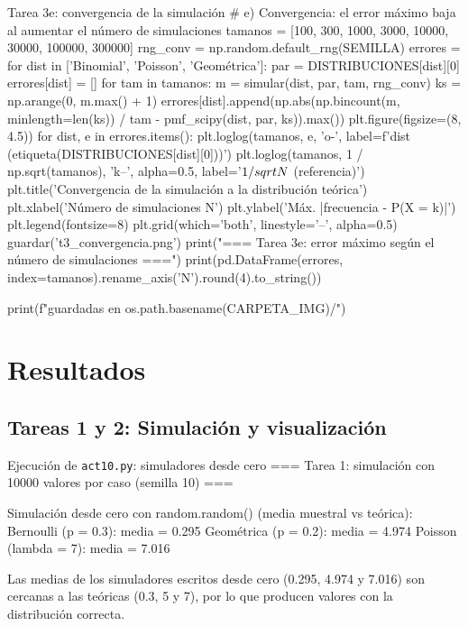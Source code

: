 \documentclass[11pt,letterpaper]{article}
\begin{document}
\begin{codigo}[label=cod:t3e]{Tarea 3e: convergencia de la simulación}
# e) Convergencia: el error máximo baja al aumentar el número de simulaciones
tamanos = [100, 300, 1000, 3000, 10000, 30000, 100000, 300000]
rng_conv = np.random.default_rng(SEMILLA)
errores = {}
for dist in ['Binomial', 'Poisson', 'Geométrica']:
    par = DISTRIBUCIONES[dist][0]
    errores[dist] = []
    for tam in tamanos:
        m = simular(dist, par, tam, rng_conv)
        ks = np.arange(0, m.max() + 1)
        errores[dist].append(np.abs(np.bincount(m, minlength=len(ks)) / tam
                                    - pmf_scipy(dist, par, ks)).max())
plt.figure(figsize=(8, 4.5))
for dist, e in errores.items():
    plt.loglog(tamanos, e, 'o-', label=f'{dist} ({etiqueta(DISTRIBUCIONES[dist][0])})')
plt.loglog(tamanos, 1 / np.sqrt(tamanos), 'k--', alpha=0.5, label='$1/\\sqrt{N}$ (referencia)')
plt.title('Convergencia de la simulación a la distribución teórica')
plt.xlabel('Número de simulaciones N')
plt.ylabel('Máx. |frecuencia - P(X = k)|')
plt.legend(fontsize=8)
plt.grid(which='both', linestyle='--', alpha=0.5)
guardar('t3_convergencia.png')
print("\n=== Tarea 3e: error máximo según el número de simulaciones ===")
print(pd.DataFrame(errores, index=tamanos).rename_axis('N').round(4).to_string())

print(f"\nFiguras guardadas en {os.path.basename(CARPETA_IMG)}/")
\end{codigo}

\newpage
\section{Resultados}

\subsection{Tareas 1 y 2: Simulación y visualización}

\begin{consola}[label=out:t1]{Ejecución de \texttt{act10.py}: simuladores desde cero}
=== Tarea 1: simulación con 10000 valores por caso (semilla 10) ===

Simulación desde cero con random.random() (media muestral vs teórica):
  Bernoulli (p = 0.3): media = 0.295
  Geométrica (p = 0.2): media = 4.974
  Poisson (lambda = 7): media = 7.016
\end{consola}

Las medias de los simuladores escritos desde cero (0.295, 4.974 y 7.016) son cercanas a las teóricas (0.3, 5 y 7), por lo que producen valores con la distribución correcta.
\end{document}

